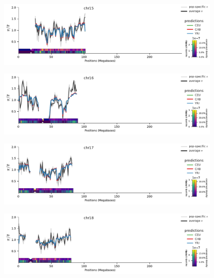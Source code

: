 \documentclass[11pt]{article}
\begin{document}
\begin{figure}[!htb]
  \centering
  \includegraphics[width=\textwidth]{figures/supplementary/pred_plot_chr15.pdf}
  \label{suppfig:fit-chr15}
\end{figure}


\begin{figure}[!htb]
  \centering
  \includegraphics[width=\textwidth]{figures/supplementary/pred_plot_chr16.pdf}
  \label{suppfig:fit-chr16}
\end{figure}


\begin{figure}[!htb]
  \centering
  \includegraphics[width=\textwidth]{figures/supplementary/pred_plot_chr17.pdf}
  \label{suppfig:fit-chr17}
\end{figure}


\begin{figure}[!htb]
  \centering
  \includegraphics[width=\textwidth]{figures/supplementary/pred_plot_chr18.pdf}
  \label{suppfig:fit-chr18}
\end{figure}
\end{document}

